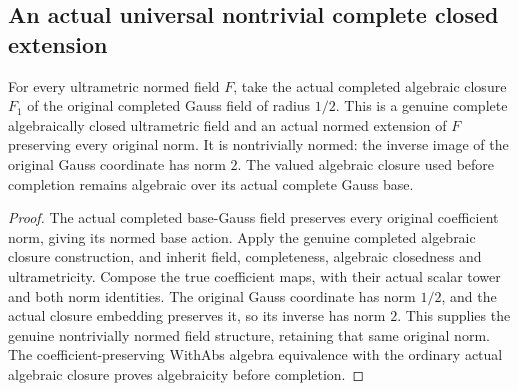 \subsection{An actual universal nontrivial complete closed extension}

\begin{definition}
\label{def:fc-nontrivial-complete-scalar-field}
\leanok
{}
For every ultrametric normed field $F$, take the actual completed
algebraic closure $F_1$ of the original completed Gauss field of radius
$1/2$. This is a genuine complete algebraically closed ultrametric field
and an actual normed extension of $F$ preserving every original norm.
It is nontrivially normed: the inverse image of the original Gauss
coordinate has norm $2$. The valued algebraic closure used before
completion remains algebraic over its actual complete Gauss base.
\end{definition}
\begin{proof}
The actual completed base-Gauss field preserves every original
coefficient norm, giving its normed base action. Apply the genuine
completed algebraic closure construction, and inherit field,
completeness, algebraic closedness and ultrametricity. Compose the true
coefficient maps, with their actual scalar tower and both norm
identities. The original Gauss coordinate has norm $1/2$, and the
actual closure embedding preserves it, so its inverse has norm $2$.
This supplies the genuine nontrivially normed field structure, retaining
that same original norm. The coefficient-preserving WithAbs algebra
equivalence with the ordinary actual algebraic closure proves
algebraicity before completion.
\end{proof}

